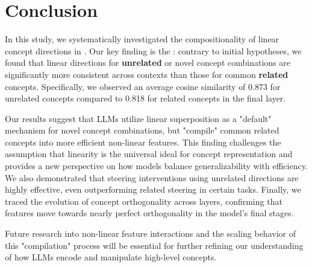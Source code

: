 \section{Conclusion}
\label{sec:conclusion}

In this study, we systematically investigated the compositionality of linear concept directions in \qwen. Our key finding is the \textbf{\consistencyparadox}: contrary to initial hypotheses, we found that linear directions for \textbf{unrelated} or novel concept combinations are significantly more consistent across contexts than those for common \textbf{related} concepts. Specifically, we observed an average cosine similarity of 0.873 for unrelated concepts compared to 0.818 for related concepts in the final layer.

Our results suggest that LLMs utilize linear superposition as a "default" mechanism for novel concept combinations, but "compile" common related concepts into more efficient non-linear features. This finding challenges the assumption that linearity is the universal ideal for concept representation and provides a new perspective on how models balance generalizability with efficiency. We also demonstrated that steering interventions using unrelated directions are highly effective, even outperforming related steering in certain tasks. Finally, we traced the evolution of concept orthogonality across layers, confirming that features move towards nearly perfect orthogonality in the model's final stages.

Future research into non-linear feature interactions and the scaling behavior of this "compilation" process will be essential for further refining our understanding of how LLMs encode and manipulate high-level concepts.
